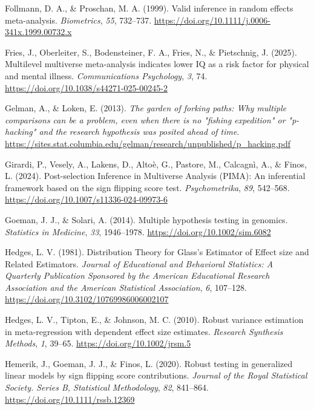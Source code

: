 \documentclass[
  man,
  longtable,
  nolmodern,
  notxfonts,
  notimes,
  colorlinks=true,linkcolor=blue,citecolor=blue,urlcolor=blue]{apa7}
\newlength{\cslhangindent}
\newenvironment{CSLReferences}[2] %
 {\begin{list}{}{%
  \setlength{\itemindent}{0pt}
  \setlength{\leftmargin}{0pt}
  \setlength{\parsep}{0pt}
  \ifodd #1
   \setlength{\leftmargin}{\cslhangindent}
   \setlength{\itemindent}{-1\cslhangindent}
  \fi
  \setlength{\itemsep}{#2\baselineskip}}}
 {\end{list}}
\begin{document}
\begin{CSLReferences}{1}{0}
Follmann, D. A., \& Proschan, M. A. (1999). {Valid inference in random
effects meta-analysis}. \emph{Biometrics}, \emph{55}, 732--737.
\url{https://doi.org/10.1111/j.0006-341x.1999.00732.x}

Fries, J., Oberleiter, S., Bodensteiner, F. A., Fries, N., \&
Pietschnig, J. (2025). {Multilevel multiverse meta-analysis indicates
lower IQ as a risk factor for physical and mental illness}.
\emph{Communications Psychology}, \emph{3}, 74.
\url{https://doi.org/10.1038/s44271-025-00245-2}

Gelman, A., \& Loken, E. (2013). \emph{{The garden of forking paths: Why
multiple comparisons can be a problem, even when there is no "fishing
expedition" or "p-hacking" and the research hypothesis was posited ahead
of time}}.
\url{https://sites.stat.columbia.edu/gelman/research/unpublished/p_hacking.pdf}

Girardi, P., Vesely, A., Lakens, D., Altoè, G., Pastore, M., Calcagnì,
A., \& Finos, L. (2024). {Post-selection Inference in Multiverse
Analysis (PIMA): An inferential framework based on the sign flipping
score test}. \emph{Psychometrika}, \emph{89}, 542--568.
\url{https://doi.org/10.1007/s11336-024-09973-6}

Goeman, J. J., \& Solari, A. (2014). {Multiple hypothesis testing in
genomics}. \emph{Statistics in Medicine}, \emph{33}, 1946--1978.
\url{https://doi.org/10.1002/sim.6082}

Hedges, L. V. (1981). {Distribution Theory for Glass's Estimator of
Effect size and Related Estimators}. \emph{Journal of Educational and
Behavioral Statistics: A Quarterly Publication Sponsored by the American
Educational Research Association and the American Statistical
Association}, \emph{6}, 107--128.
\url{https://doi.org/10.3102/10769986006002107}

Hedges, L. V., Tipton, E., \& Johnson, M. C. (2010). {Robust variance
estimation in meta-regression with dependent effect size estimates}.
\emph{Research Synthesis Methods}, \emph{1}, 39--65.
\url{https://doi.org/10.1002/jrsm.5}

Hemerik, J., Goeman, J. J., \& Finos, L. (2020). {Robust testing in
generalized linear models by sign flipping score contributions}.
\emph{Journal of the Royal Statistical Society. Series B, Statistical
Methodology}, \emph{82}, 841--864.
\url{https://doi.org/10.1111/rssb.12369}


\end{CSLReferences}
\end{document}
